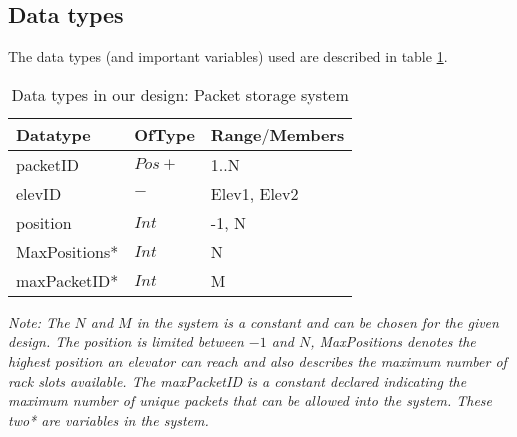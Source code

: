 \subsection*{Data types}
The data types (and important variables) used are described in table \ref{tab: data_types}.
\begin{table}[h]
\centering
\begin{tabular}{|l|l|l|}\hline
Datatype & OfType & Range$\slash$Members\\\hline
packetID & $Pos+$ & { 1..N} \\\hline
elevID & $ - $ & { Elev1, Elev2}\\\hline
position & $Int$ & { -1, N}\\\hline
MaxPositions* & $Int$ & { N} \\\hline
maxPacketID* & $Int$ & { M} \\\hline
\end{tabular}
\caption{Data types in our design: Packet storage system }
\label{tab: data_types}
\end{table}

\textit{Note: The $N$ and $M$ in the system is a constant and can be chosen for the given design. The position is limited between $-1$ and $N$, \textit{MaxPositions} denotes the highest position an elevator can reach and also describes the maximum number of rack slots available. The \textit{maxPacketID} is a constant declared indicating the maximum number of unique packets that can be allowed into the system. These two* are variables in the system.}